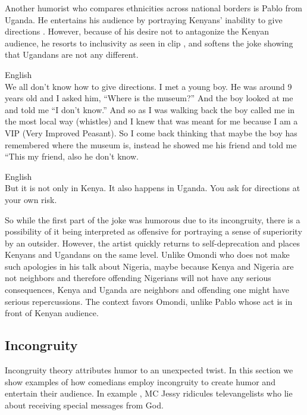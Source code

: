 \documentclass[output=paper]{langsci/langscibook}
\begin{document}
Another humorist who compares ethnicities across national borders is Pablo from Uganda. He entertains his audience by portraying Kenyans’ inability to give directions . However, because of his desire not to antagonize the Kenyan audience, he resorts to inclusivity as seen in clip , and softens the joke showing that Ugandans are not any different.

\ea\label{ex:muaka:6} English \\
\smallskip
We all don’t know how to give directions. I met a young boy. He was around 9 years old and I asked him, “Where is the museum?” And the boy looked at me and told me “I don’t know.” And so as I was walking back the boy called me in the most local way \textup{(whistles)} and I knew that was meant for me because I am a VIP (Very Improved Peasant). So I come back thinking that maybe the boy has remembered where the museum is, instead he showed me his friend and told me “This my friend, also he don’t know. 
\citep{Omogi2012}
\z

\ea\label{ex:muaka:7} English \\
\smallskip
 But it is not only in Kenya. It also happens in Uganda. You ask for directions at your own risk. 
 \citep{Omogi2012}
\z

So while the first part of the joke was humorous due to its incongruity, there is a possibility of it being interpreted as offensive for portraying a sense of superiority by an outsider. However, the artist quickly returns to self-deprecation and places Kenyans and Ugandans on the same level. Unlike Omondi who does not make such apologies in his talk about Nigeria, maybe because Kenya and Nigeria are not neighbors and therefore offending Nigerians will not have any serious consequences, Kenya and Uganda are neighbors and offending one might have serious repercussions. The context favors Omondi, unlike Pablo whose act is in front of Kenyan audience.

\subsection{Incongruity}

Incongruity theory attributes humor to an unexpected twist. In this section we show examples of how comedians employ incongruity to create humor and entertain their audience. In example , MC Jessy ridicules televangelists who lie about receiving special messages from God.
\end{document}
